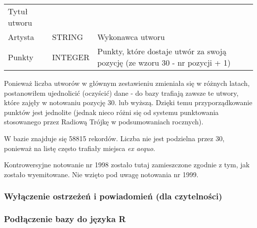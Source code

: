 \documentclass[11pt]{article}
\begin{document}
\begin{longtable}[]{@{}lll@{}}
\begin{minipage}[t]{0.30\columnwidth}
Tytuł utworu\strut
\end{minipage}\tabularnewline
\begin{minipage}[t]{0.30\columnwidth}\raggedright
Artysta\strut
\end{minipage} & \begin{minipage}[t]{0.30\columnwidth}\raggedright
STRING\strut
\end{minipage} & \begin{minipage}[t]{0.30\columnwidth}\raggedright
Wykonawca utworu\strut
\end{minipage}\tabularnewline
\begin{minipage}[t]{0.30\columnwidth}\raggedright
Punkty\strut
\end{minipage} & \begin{minipage}[t]{0.30\columnwidth}\raggedright
INTEGER\strut
\end{minipage} & \begin{minipage}[t]{0.30\columnwidth}\raggedright
Punkty, które dostaje utwór za swoją pozycję (ze wzoru 30 - nr pozycji +
1)\strut
\end{minipage}\tabularnewline
\bottomrule
\end{longtable}

Ponieważ liczba utworów w głównym zestawieniu zmieniała się w różnych
latach, postanowiłem ujednolicić (oczyścić) dane - do bazy trafiają
zawsze te utwory, które zajęły w notowaniu pozycję 30. lub wyższą.
Dzięki temu przyporządkowanie punktów jest jednolite (jednak nieco różni
się od systemu punktowania stosowanego przez Radiową Trójkę w
podsumowaniach rocznych).

W bazie znajduje się 58815 rekordów. Liczba nie jest podzielna przez 30,
ponieważ na listę często trafiały miejsca \emph{ex aequo}.

Kontrowersyjne notowanie nr 1998 zostało tutaj zamieszczone zgodnie z
tym, jak zostało wyemitowane. Nie wzięto pod uwagę notowania nr 1999.

    \hypertarget{wyux142ux105czenie-ostrzeux17ceux144-i-powiadomieux144-dla-czytelnoux15bci}{%
\subsubsection{Wyłączenie ostrzeżeń i powiadomień (dla
czytelności)}\label{wyux142ux105czenie-ostrzeux17ceux144-i-powiadomieux144-dla-czytelnoux15bci}}

    \hypertarget{podux142ux105czenie-bazy-do-jux119zyka-r}{%
\subsubsection{Podłączenie bazy do języka
R}\label{podux142ux105czenie-bazy-do-jux119zyka-r}}
\end{document}
